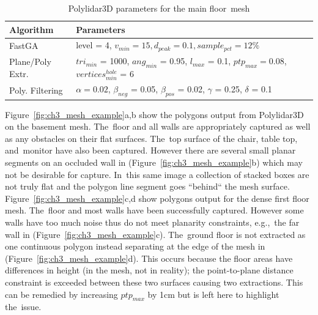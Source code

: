 \begin{table}[H]
\centering
\caption{Polylidar3D parameters for the main floor~mesh}\label{table:ch3_mesh_parameters_b}
\begin{tabular}{@{}ll@{}}
\toprule
\textbf{Algorithm}        & \textbf{Parameters}                                                          \\ \midrule
FastGA           & level = 4,  $v_{min} = 15, d_{peak} = 0.1, sample_{pct} = 12\%$            \\
Plane/Poly Extr.      & $tri_{min}$ = 1000, $ang_{min}$ = 0.95, $l_{max}$ = 0.1, $ptp_{max} = 0.08$, $vertices^{hole}_{min}$ = 6     \\
Poly. Filtering      & $\alpha = 0.02$, $\beta_{neg}$ = 0.05, $\beta_{pos}$ = 0.02, $\gamma$ = 0.25, $\delta$ = 0.1    \\ \bottomrule
\end{tabular}
\end{table}

Figure~\ref{fig:ch3_mesh_example}a,b show the polygons output from Polylidar3D on the basement mesh.  The~floor and all walls are appropriately captured as well as any obstacles on their flat surfaces. The~top surface of the chair, table top, and~monitor have also been captured. However there are several small planar segments on an occluded wall in (Figure~\ref{fig:ch3_mesh_example}b) which may not be desirable for capture. In~this same image a collection of stacked boxes are not truly flat and the polygon line segment goes ``behind`` the mesh surface.  Figure~\ref{fig:ch3_mesh_example}c,d show  polygons output for the dense first floor mesh. The~floor and most walls have been successfully captured. However some walls have too much noise thus do not meet planarity constraints, e.g.,~the far wall in (Figure~\ref{fig:ch3_mesh_example}c). The~ground floor is not extracted as one continuous polygon instead separating at the edge of the mesh in (Figure~\ref{fig:ch3_mesh_example}d).  This occurs because the floor areas have differences in height (in the mesh, not in reality); the point-to-plane distance constraint is exceeded between these two surfaces causing two extractions. This can be remedied by increasing $ptp_{max}$ by 1cm but is left here to highlight the~issue.


